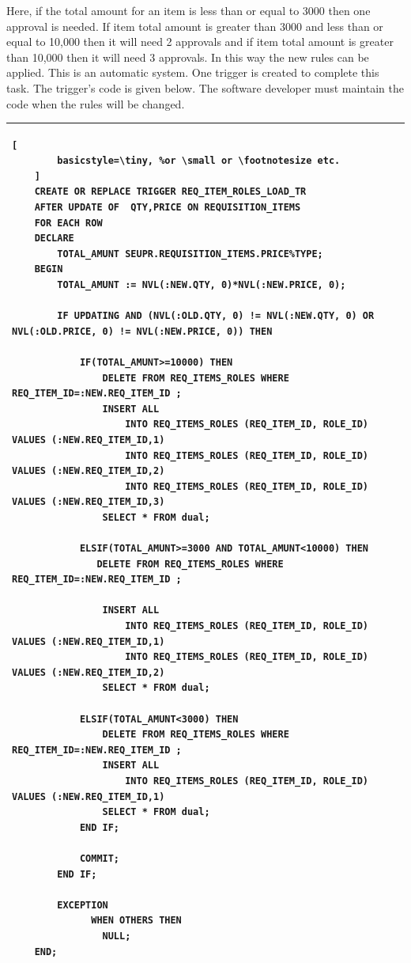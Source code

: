 \documentclass[12pt]{report} %
\begin{document}
Here, if the total amount for an item is less than or equal to 3000 then one approval is needed. If item total amount is greater than 3000 and less than or equal to 10,000 then it will need 2 approvals  and if item total amount is greater than 10,000 then it will need 3 approvals. In this way the new rules can be applied. This is an automatic system. One trigger is created to complete this task. The trigger's code is given below. The software developer must maintain the code when the rules will be changed.\\%



\begin{table}

	\begin{tabular}{|l|}
	\hline
	\begin{lstlisting}[
	    basicstyle=\tiny, %or \small or \footnotesize etc.
	]
	CREATE OR REPLACE TRIGGER REQ_ITEM_ROLES_LOAD_TR
	AFTER UPDATE OF  QTY,PRICE ON REQUISITION_ITEMS  
	FOR EACH ROW
	DECLARE
	    TOTAL_AMUNT SEUPR.REQUISITION_ITEMS.PRICE%TYPE;
	BEGIN
	    TOTAL_AMUNT := NVL(:NEW.QTY, 0)*NVL(:NEW.PRICE, 0);

	    IF UPDATING AND (NVL(:OLD.QTY, 0) != NVL(:NEW.QTY, 0) OR NVL(:OLD.PRICE, 0) != NVL(:NEW.PRICE, 0)) THEN

	        IF(TOTAL_AMUNT>=10000) THEN
	            DELETE FROM REQ_ITEMS_ROLES WHERE REQ_ITEM_ID=:NEW.REQ_ITEM_ID ;
	            INSERT ALL
	                INTO REQ_ITEMS_ROLES (REQ_ITEM_ID, ROLE_ID) VALUES (:NEW.REQ_ITEM_ID,1)
	                INTO REQ_ITEMS_ROLES (REQ_ITEM_ID, ROLE_ID) VALUES (:NEW.REQ_ITEM_ID,2)
	                INTO REQ_ITEMS_ROLES (REQ_ITEM_ID, ROLE_ID) VALUES (:NEW.REQ_ITEM_ID,3)
	            SELECT * FROM dual;

	        ELSIF(TOTAL_AMUNT>=3000 AND TOTAL_AMUNT<10000) THEN
	           DELETE FROM REQ_ITEMS_ROLES WHERE REQ_ITEM_ID=:NEW.REQ_ITEM_ID ;

	            INSERT ALL
	                INTO REQ_ITEMS_ROLES (REQ_ITEM_ID, ROLE_ID) VALUES (:NEW.REQ_ITEM_ID,1)
	                INTO REQ_ITEMS_ROLES (REQ_ITEM_ID, ROLE_ID) VALUES (:NEW.REQ_ITEM_ID,2)
	            SELECT * FROM dual;

	        ELSIF(TOTAL_AMUNT<3000) THEN
	            DELETE FROM REQ_ITEMS_ROLES WHERE REQ_ITEM_ID=:NEW.REQ_ITEM_ID ;
	            INSERT ALL
	                INTO REQ_ITEMS_ROLES (REQ_ITEM_ID, ROLE_ID) VALUES (:NEW.REQ_ITEM_ID,1)
	            SELECT * FROM dual;
	        END IF;

	        COMMIT;
	    END IF;

	    EXCEPTION
	          WHEN OTHERS THEN
	            NULL;
	END;
	\end{lstlisting}\\
	\hline
	\end{tabular}
\end{table}
\end{document}
